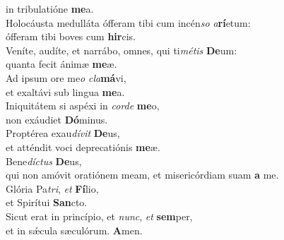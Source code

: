 \oddverse in tribulatióne \textbf{me}a.\\
\evenverse Holocáusta medulláta ófferam tibi cum incén\textit{so} \textit{a}\textbf{rí}etum:~\*\\
\evenverse ófferam tibi boves cum \textbf{hir}cis.\\
\oddverse Veníte, audíte, et narrábo, omnes, qui ti\textit{mé}\textit{tis} \textbf{De}um:~\*\\
\oddverse quanta fecit ánimæ \textbf{me}æ.\\
\evenverse Ad ipsum ore me\textit{o} \textit{cla}\textbf{má}vi,~\*\\
\evenverse et exaltávi sub lingua \textbf{me}a.\\
\oddverse Iniquitátem si aspéxi in \textit{cor}\textit{de} \textbf{me}o,~\*\\
\oddverse non exáudiet \textbf{Dó}minus.\\
\evenverse Proptérea exau\textit{dí}\textit{vit} \textbf{De}us,~\*\\
\evenverse et atténdit voci deprecatiónis \textbf{me}æ.\\
\oddverse Bene\textit{dí}\textit{ctus} \textbf{De}us,~\*\\
\oddverse qui non amóvit oratiónem meam, et misericórdiam suam \textbf{a} me.\\
\evenverse Glória Pa\textit{tri}, \textit{et} \textbf{Fí}lio,~\*\\
\evenverse et Spirítui \textbf{San}cto.\\
\oddverse Sicut erat in princípio, et \textit{nunc}, \textit{et} \textbf{sem}per,~\*\\
\oddverse et in sǽcula sæculórum. \textbf{A}men.\\
